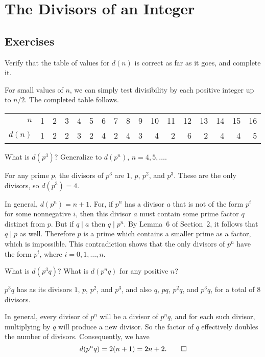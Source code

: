 \chapter{The Divisors of an Integer}

\section{Exercises}

 Verify that the table of values for $d(n)$ is correct as
far as it goes, and complete it.
\begin{solution}
  For small values of $n$, we can simply test divisibility by each
  positive integer up to $n/2$. The completed table follows.
  \begin{center}
    \begin{tabular}{r|rrrrrrrrrrrrrrrr}
      $n$ & 1 & 2 & 3 & 4 & 5 & 6 & 7 & 8 & 9 & 10
      & 11 & 12 & 13 & 14 & 15 & 16 \\
      $d(n)$ & 1 & 2 & 2 & 3 & 2 & 4 & 2 & 4 & 3 & 4
      & 2 & 6 & 2 & 4 & 4 & 5
    \end{tabular}
  \end{center}
\end{solution}

 What is $d(p^3)$? Generalize to $d(p^n)$,
$n = 4, 5, \dots$.
\begin{solution}
  For any prime $p$, the divisors of $p^3$ are $1$, $p$, $p^2$, and
  $p^3$. These are the only divisors, so $d(p^3) = 4$.

  In general, $d(p^n) = n + 1$. For, if $p^n$ has a divisor $a$ that
  is not of the form $p^i$ for some nonnegative $i$, then this divisor
  $a$ must contain some prime factor $q$ distinct from $p$. But if
  $q\mid a$ then $q\mid p^n$. By Lemma~6 of Section~2, it follows that
  $q\mid p$ as well. Therefore $p$ is a prime which contains a smaller
  prime as a factor, which is impossible. This contradiction shows
  that the only divisors of $p^n$ have the form $p^i$, where
  $i = 0, 1, \dots, n$.
\end{solution}

 What is $d(p^3q)$? What is $d(p^nq)$ for any positive $n$?
\begin{solution}
  $p^3q$ has as its divisors $1$, $p$, $p^2$, and $p^3$, and also $q$,
  $pq$, $p^2q$, and $p^3q$, for a total of $8$ divisors.

  In general, every divisor of $p^n$ will be a divisor of $p^nq$, and
  for each such divisor, multiplying by $q$ will produce a new
  divisor. So the factor of $q$ effectively doubles the number of
  divisors. Consequently, we have
  \begin{equation*}
    d(p^nq) = 2(n + 1) = 2n + 2. \qedhere
  \end{equation*}
\end{solution}

